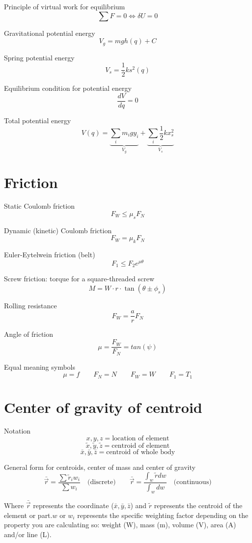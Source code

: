 \documentclass[11pt, titlepage]{article} %
\begin{document}
Principle of virtual work for equilibrium
\[\sum F = 0 \Leftrightarrow \delta U = 0\]

Gravitational potential energy
\[V_g = mgh(q) + C\]

Spring potential energy
\[V_s = \frac{1}{2} ks^2 (q)\]

Equilibrium condition for potential energy
\[\frac{dV}{dq} = 0\]

Total potential energy
\[V(q) = \underbrace{\sum_im_igy_i}_{V_g} + \underbrace{\sum_i\frac{1}{2}kx_s^2}_{V_s}\]

\section{Friction}
Static Coulomb friction
\[F_W \leq \mu_s F_N \]

Dynamic (kinetic) Coulomb friction
\[F_W = \mu_k F_N \]

Euler-Eytelwein friction (belt)
\[F_1 \leq F_2 e^{\mu \theta} \]

Screw friction: torque for a square-threaded screw
\[M = W \cdot r \cdot \tan(\theta \pm \phi_s)\]

Rolling resistance
\[F_W = \frac{a}{r} F_N\]

Angle of friction
\[\mu = \frac{F_W}{F_N} = tan(\psi)\]

Equal meaning symbols
\[\mu = f \qquad F_N = N \qquad F_W = W \qquad F_1 = T_1\]

\section{Center of gravity of centroid}
Notation
\[x, y, z= \text{location of element}\]
\[\tilde{x}, \tilde{y}, \tilde{z}= \text{centroid of element}\]
\[\bar{x}, \bar{y}, \bar{z}= \text{centroid of whole body}\]

General form for centroids, center of mass and center of gravity
\[\bar{\vec{r}}= \frac{\sum{\tilde{r}_iw_i}}{\sum{w_i}} \quad \text{(discrete)} \qquad \bar{\vec{r}}= \frac{\int_w{\tilde{r}dw}}{\int_w{dw}} \quad \text{(continuous)}\]
\begin{center}
    Where $\bar{\vec{r}}$ represents the coordinate ($\bar{x}, \bar{y}, \bar{z}$) and $\tilde{r}$ represents the centroid of the element or part.$w$ or $w_i$ represents the specific weighting factor depending on the property you are calculating so: weight (W), mass (m), volume (V), area (A) and/or line (L).
\end{center}
\end{document}
